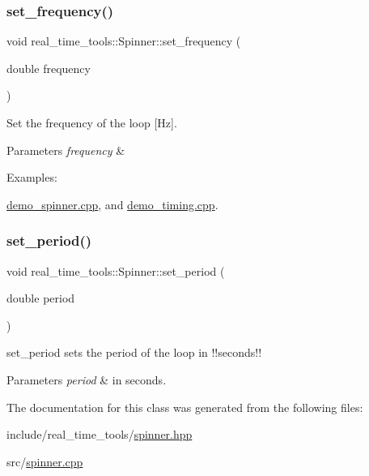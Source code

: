 \subsubsection{\texorpdfstring{set\+\_\+frequency()}{set\_frequency()}}
{\footnotesize\ttfamily void real\+\_\+time\+\_\+tools\+::\+Spinner\+::set\+\_\+frequency (\begin{DoxyParamCaption}\item[{double}]{frequency }\end{DoxyParamCaption})\hspace{0.3cm}{\ttfamily [inline]}}



Set the frequency of the loop \mbox{[}Hz\mbox{]}. 


\begin{DoxyParams}{Parameters}
{\em frequency} & \\
\hline
\end{DoxyParams}
\begin{Desc}
\item[Examples\+: ]\par
\hyperlink{demo_spinner_8cpp-example}{demo\+\_\+spinner.\+cpp}, and \hyperlink{demo_timing_8cpp-example}{demo\+\_\+timing.\+cpp}.\end{Desc}
\mbox{\label{classreal__time__tools_1_1Spinner_ac945d6df02f33e75f499922d23838408}} 
\subsubsection{\texorpdfstring{set\+\_\+period()}{set\_period()}}
{\footnotesize\ttfamily void real\+\_\+time\+\_\+tools\+::\+Spinner\+::set\+\_\+period (\begin{DoxyParamCaption}\item[{double}]{period }\end{DoxyParamCaption})\hspace{0.3cm}{\ttfamily [inline]}}



set\+\_\+period sets the period of the loop in !!seconds!! 


\begin{DoxyParams}{Parameters}
{\em period} & in seconds. \\
\hline
\end{DoxyParams}


The documentation for this class was generated from the following files\+:\begin{DoxyCompactItemize}
\item 
include/real\+\_\+time\+\_\+tools/\hyperlink{spinner_8hpp}{spinner.\+hpp}\item 
src/\hyperlink{spinner_8cpp}{spinner.\+cpp}\end{DoxyCompactItemize}
